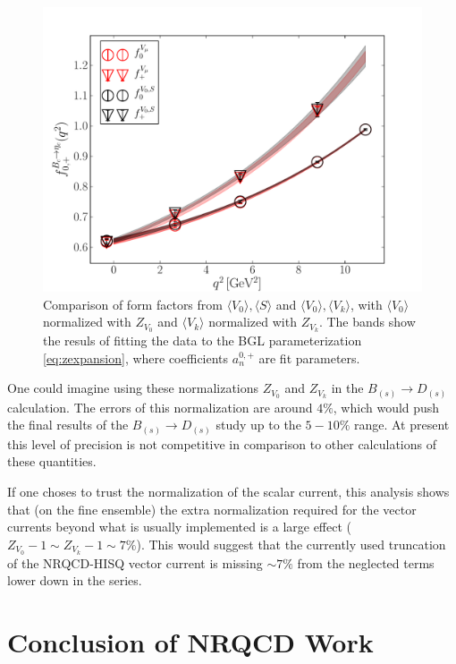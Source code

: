 \begin{figure}[htb!]
\centering
\includegraphics[scale=0.55]{images/nrqcd/Bcetac_bothways_3.pdf}
\caption{Comparison of form factors from $\langle V_0 \rangle, \langle S \rangle$ and $\langle V_0 \rangle,\langle V_k \rangle$, with $\langle V_0 \rangle$ normalized with $Z_{V_0}$ and $\langle V_k \rangle$ normalized with $Z_{V_k}$. The bands show the resuls of fitting the data to the BGL parameterization \eqref{eq:zexpansion}, where coefficients $a^{0,+}_n$ are fit parameters. \label{fig:identicle}}
\end{figure}

One could imagine using these normalizations $Z_{V_0}$ and $Z_{V_k}$ in the $B_{(s)}\to D_{(s)}$ calculation. The errors of this normalization are around $4\%$, which would push the final results of the $B_{(s)}\to D_{(s)}$ study up to the $5-10\%$ range. At present this level of precision is not competitive in comparison to other calculations of these quantities.

If one choses to trust the normalization of the scalar current, this analysis shows that (on the fine ensemble) the extra normalization required for the vector currents beyond what is usually implemented is a large effect ($Z_{V_0}-1\sim Z_{V_k}-1\sim 7\%$). This would suggest that the currently used truncation of the NRQCD-HISQ vector current is missing $\sim 7\%$ from the neglected terms lower down in the series. 

\section{Conclusion of NRQCD Work}

